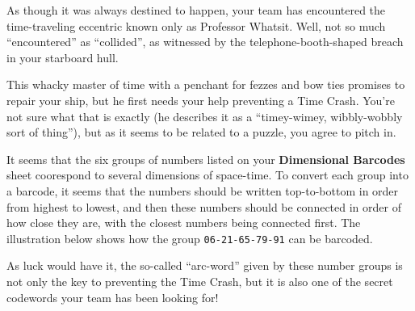 As though it was always destined to happen, your team has encountered
the time-traveling eccentric known only as Professor Whatsit. Well, not
so much ``encountered'' as ``collided'', as witnessed by the 
telephone-booth-shaped breach in your starboard hull.

This whacky master of time with a penchant for fezzes and bow ties promises to
repair your ship, but he first needs your help preventing a
Time Crash. You're not sure what that is exactly (he describes it as a
``timey-wimey, wibbly-wobbly sort of thing''), but as it seems to be 
related to a puzzle, you agree to pitch in.

It seems that the six groups of numbers listed on your
\textbf{Dimensional Barcodes} sheet coorespond to several dimensions
of space-time. To convert each group into a barcode, it seems that
the numbers should be written top-to-bottom in order from highest to lowest, 
and then these numbers should
be connected in order of how close they are, with the closest numbers
being connected first. The illustration below shows how the group
\texttt{06-21-65-79-91} can be barcoded.

As luck would have it, the so-called ``arc-word'' given by
these number groups is not only the key to preventing the Time Crash,
but it is also one of the secret codewords your team has been looking
for!

\begin{center}
\end{center} 
